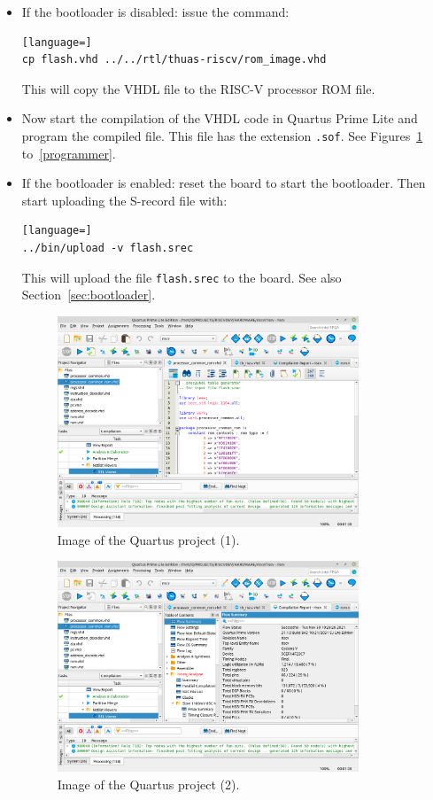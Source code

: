 \documentclass[12pt]{article}
\begin{document}
\begin{itemize}
\item If the bootloader is disabled: issue the command:
\begin{lstlisting}[language=]
cp flash.vhd ../../rtl/thuas-riscv/rom_image.vhd
\end{lstlisting}
This will copy the VHDL file to the RISC-V processor ROM file.
\item Now start the compilation of the VHDL code in Quartus Prime Lite and program the compiled file. This file has the extension \lstinline|.sof|. See Figures~\ref{quartus1} to~\ref{programmer}.
\item If the bootloader is enabled: reset the board to start the bootloader. Then start uploading the S-record file with:
\begin{lstlisting}[language=]
../bin/upload -v flash.srec
\end{lstlisting}
This will upload the file \lstinline|flash.srec| to the board. See also Section~\ref{sec:bootloader}.

\begin{figure}[!ht]
\centering
\includegraphics[width=0.85\textwidth]{images/quartus1}
\caption{Image of the Quartus project (1).}
\label{quartus1}
\end{figure}

\begin{figure}[!ht]
\centering
\includegraphics[width=0.85\textwidth]{images/quartus2}
\caption{Image of the Quartus project (2).}
\label{quartus2}
\end{figure}


\end{itemize}
\end{document}
